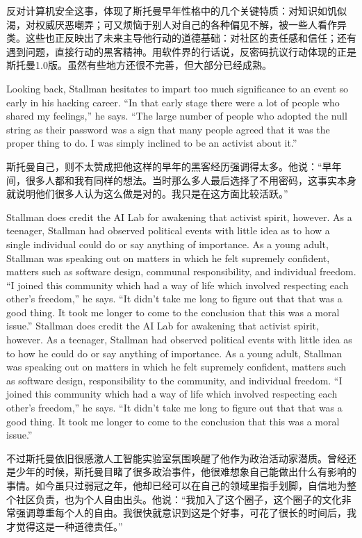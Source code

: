 \ifdefined\chs
反对计算机安全这事，体现了斯托曼早年性格中的几个关键特质：对知识如饥似渴，对权威厌恶嘲弄；可又烦恼于别人对自己的各种偏见不解，被一些人看作异类。这些也正反映出了未来主导他行动的道德基础：对社区的责任感和信任；还有遇到问题，直接行动的黑客精神。用软件界的行话说，反密码抗议行动体现的正是斯托曼1.0版。虽然有些地方还很不完善，但大部分已经成熟。
\fi

\ifdefined\eng
Looking back, Stallman hesitates to impart too much significance to an event so early in his hacking career. ``In that early stage there were a lot of people who shared my feelings,'' he says. ``The large number of people who adopted the null string as their password was a sign that many people agreed that it was the proper thing to do. I was simply inclined to be an activist about it.''
\fi

\ifdefined\chs
斯托曼自己，则不太赞成把他这样的早年的黑客经历强调得太多。他说：``早年间，很多人都和我有同样的想法。当时那么多人最后选择了不用密码，这事实本身就说明他们很多人认为这么做是对的。我只是在这方面比较活跃。''
\fi

\ifdefined\eng
\ifdefined\vone
Stallman does credit the AI Lab for awakening that activist spirit, however. As a teenager, Stallman had observed political events with little idea as to how a single individual could do or say anything of importance. As a young adult, Stallman was speaking out on matters in which he felt supremely confident, matters such as software design, communal responsibility, and individual freedom. ``I joined this community which had a way of life which involved respecting each other's freedom,'' he says. ``It didn't take me long to figure out that that was a good thing. It took me longer to come to the conclusion that this was a moral issue.''
\fi
\ifdefined\vtwo
Stallman does credit the AI Lab for awakening that activist spirit, however. As a teenager, Stallman had observed political events with little idea as to how he could do or say anything of importance. As a young adult, Stallman was speaking out on matters in which he felt supremely confident, matters such as software design, responsibility to the community, and individual freedom. ``I joined this community which had a way of life which involved respecting each other's freedom,'' he says. ``It didn't take me long to figure out that that was a good thing. It took me longer to come to the conclusion that this was a moral issue.''
\fi
\fi

\ifdefined\chs
不过斯托曼依旧很感激人工智能实验室氛围唤醒了他作为政治活动家潜质。曾经还是少年的时候，斯托曼目睹了很多政治事件，他很难想象自己能做出什么有影响的事情。如今虽只过弱冠之年，他却已经可以在自己的领域里指手划脚，自信地为整个社区负责，也为个人自由出头。他说：``我加入了这个圈子，这个圈子的文化非常强调尊重每个人的自由。我很快就意识到这是个好事，可花了很长的时间后，我才觉得这是一种道德责任。''
\fi

